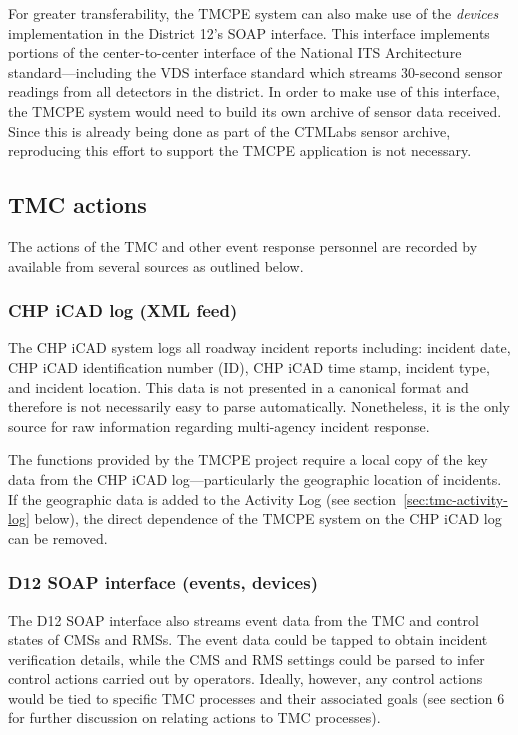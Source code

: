 \documentclass[12pt]{report}
\newcounter{time}
\begin{document}
For greater transferability, the \ac{TMCPE} system can also make use
of the \emph{devices} implementation in the District 12's SOAP
interface.  This interface implements portions of the center-to-center
interface of the National ITS Architecture standard---including the
\ac{VDS} interface standard which streams 30-second sensor readings from
all detectors in the district.  In order to make use of this
interface, the \ac{TMCPE} system would need to build its own archive
of sensor data received.  Since this is already being done as part of
the \ac{CTMLabs} sensor archive, reproducing this effort to support
the \ac{TMCPE} application is not necessary.

\subsection{TMC actions}
\label{sec:tmc-actions}

The actions of the \ac{TMC} and other event response personnel are
recorded by available from several sources as outlined below.

\subsubsection{CHP iCAD log (XML feed)}
\label{sec:chp-icad-log}

The \ac{CHP} \ac{iCAD} system logs all roadway incident reports
including: incident date, \ac{CHP} \ac{iCAD} identification number
(ID), \ac{CHP} \ac{iCAD} time stamp, incident type, and incident
location. This data is not presented in a canonical format and
therefore is not necessarily easy to parse automatically.  Nonetheless,
it is the only source for raw information regarding multi-agency
incident response.

The functions provided by the \ac{TMCPE} project require a local copy
of the key data from the \ac{CHP} \ac{iCAD} log---particularly the
geographic location of incidents.  If the geographic data is added to
the Activity Log (see section~\ref{sec:tmc-activity-log} below), the
direct dependence of the \ac{TMCPE} system on the \ac{CHP} \ac{iCAD}
log can be removed.

\subsubsection{D12 SOAP interface (events, devices)}
\label{sec:d12-soap-interface}

The \ac{D12} SOAP interface also streams event data from the \ac{TMC} and
control states of \acp{CMS} and \acp{RMS}.  The event data could be
tapped to obtain incident verification details, while the \ac{CMS} and
\ac{RMS} settings could be parsed to infer control actions carried out
by operators.  Ideally, however, any control actions would be tied to
specific \ac{TMC} processes and their associated goals (see section 6
for further discussion on relating actions to \ac{TMC} processes).
\end{document}
